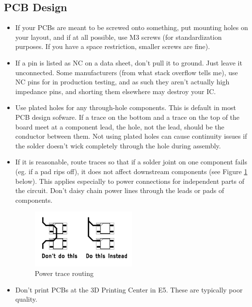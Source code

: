 \documentclass{article}
\begin{document}
\subsection{PCB Design}
\begin{itemize}
\item If your PCBs are meant to be screwed onto something, put mounting holes on your layout, and if at all possible, use M3 screws (for standardization purposes. If you have a space restriction, smaller screws are fine).
\item If a pin is listed as NC on a data sheet, don't pull it to ground. Just leave it unconnected. Some manufacturers (from what stack overflow tells me), use NC pins for in production testing, and as such they aren't actually high impedance pins, and shorting them elsewhere may destroy your IC.
\item Use plated holes for any through-hole components. This is default in most PCB design sofware. If a trace on the bottom and a trace on the top of the board meet at a component lead, the hole, not the lead, should be the conductor between them. Not using plated holes can cause continuity issues if the solder doesn't wick completely through the hole during assembly.
\item If it is reasonable, route traces so that if a solder joint on one component fails (eg. if a pad rips off), it does not affect downstream components (see Figure \ref{powertraces} below). This applies especially to power connections for independent parts of the circuit. Don't daisy chain power lines through the leads or pads of components.

\begin{figure}[h]
    \centering
    \includegraphics[height=3cm]{power_traces.png}
    \caption{Power trace routing}
    \label{powertraces}
\end{figure}

\item Don't print PCBs at the 3D Printing Center in E5. These are typically poor quality.


\end{itemize}
\end{document}
